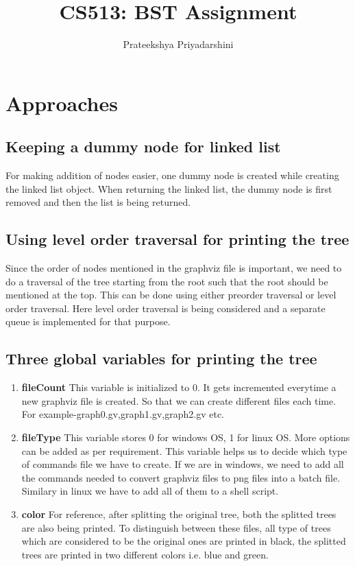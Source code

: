 \documentclass{article}
\title{CS513: BST Assignment}
\date{}
\author{Prateekshya Priyadarshini}
\affil{M.Tech CSE}
\begin{document}
\tableofcontents
\newpage
{}
\maketitle

\section{Approaches}
\subsection{Keeping a dummy node for linked list}
For making addition of nodes easier, one dummy node is created while creating the linked list object. When returning the linked list, the dummy node is first removed and then the list is being returned.
\subsection{Using level order traversal for printing the tree}
Since the order of nodes mentioned in the graphviz file is important, we need to do a traversal of the tree starting from the root such that the root should be mentioned at the top. This can be done using either preorder traversal or level order traversal. Here level order traversal is being considered and a separate queue is implemented for that purpose.
\subsection{Three global variables for printing the tree}
\begin{enumerate}
	\item \textbf{fileCount}\newline
	This variable is initialized to 0. It gets incremented everytime a new graphviz file is created. So that we can create different files each time. For example-graph0.gv,graph1.gv,graph2.gv etc.
	\item \textbf{fileType}\newline
	This variable stores 0 for windows OS, 1 for linux OS. More options can be added as per requirement. This variable helps us to decide which type of commands file we have to create. If we are in windows, we need to add all the commands needed to convert graphviz files to png files into a batch file. Similary in linux we have to add all of them to a shell script.
	\item \textbf{color}\newline
	For reference, after splitting the original tree, both the splitted trees are also being printed. To distinguish between these files, all type of trees which are considered to be the original ones are printed in black, the splitted trees are printed in two different colors i.e. blue and green.
\end{enumerate}
\end{document}
